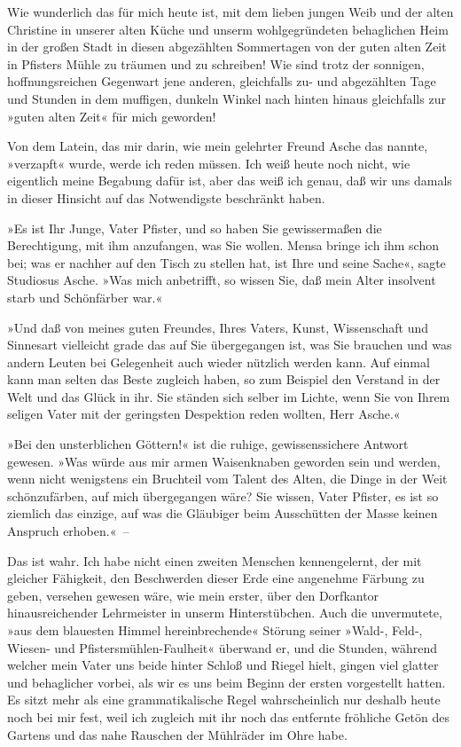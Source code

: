 Wie wunderlich das für mich heute ist, mit dem lieben jungen Weib
und der alten Christine in unserer alten Küche und unserm
wohlgegründeten behaglichen Heim in der großen Stadt in diesen
abgezählten Sommertagen von der guten alten Zeit in Pfisters Mühle
zu träumen und zu schreiben! Wie sind trotz der sonnigen,
hoffnungsreichen Gegenwart jene anderen, gleichfalls zu- und
abgezählten Tage und Stunden in dem muffigen, dunkeln Winkel nach
hinten hinaus gleichfalls zur »guten alten Zeit« für mich
geworden!

Von dem Latein, das mir darin, wie mein gelehrter Freund Asche das
nannte, »verzapft« wurde, werde ich reden müssen. Ich weiß heute
noch nicht, wie eigentlich meine Begabung dafür ist, aber das weiß
ich genau, daß wir uns damals in dieser Hinsicht auf das
Notwendigste beschränkt haben.

»Es ist Ihr Junge, Vater Pfister, und so haben Sie gewissermaßen
die Berechtigung, mit ihm anzufangen, was Sie wollen. Mensa bringe
ich ihm schon bei; was er nachher auf den Tisch zu stellen hat, ist
Ihre und seine Sache«, sagte Studiosus Asche. »Was mich anbetrifft,
so wissen Sie, daß mein Alter insolvent starb und Schönfärber
war.«

»Und daß von meines guten Freundes, Ihres Vaters, Kunst,
Wissenschaft und Sinnesart vielleicht grade das auf Sie
übergegangen ist, was Sie brauchen und was andern Leuten bei
Gelegenheit auch wieder nützlich werden kann. Auf einmal kann man
selten das Beste zugleich haben, so zum Beispiel den Verstand in
der Welt und das Glück in ihr. Sie ständen sich selber im Lichte,
wenn Sie von Ihrem seligen Vater mit der geringsten Despektion
reden wollten, Herr Asche.«

»Bei den unsterblichen Göttern!« ist die ruhige, gewissenssichere
Antwort gewesen. »Was würde aus mir armen Waisenknaben geworden
sein und werden, wenn nicht wenigstens ein Bruchteil vom Talent des
Alten, die Dinge in der Weit schönzufärben, auf mich übergegangen
wäre? Sie wissen, Vater Pfister, es ist so ziemlich das einzige,
auf was die Gläubiger beim Ausschütten der Masse keinen Anspruch
erhoben.«~–

Das ist wahr. Ich habe nicht einen zweiten Menschen kennengelernt,
der mit gleicher Fähigkeit, den Beschwerden dieser Erde eine
angenehme Färbung zu geben, versehen gewesen wäre, wie mein erster,
über den Dorfkantor hinausreichender Lehrmeister in unserm
Hinterstübchen. Auch die unvermutete, »aus dem blauesten Himmel
hereinbrechende« Störung seiner »Wald-, Feld-, Wiesen- und
Pfistersmühlen-Faulheit« überwand er, und die Stunden, während
welcher mein Vater uns beide hinter Schloß und Riegel hielt, gingen
viel glatter und behaglicher vorbei, als wir es uns beim Beginn der
ersten vorgestellt hatten. Es sitzt mehr als eine grammatikalische
Regel wahrscheinlich nur deshalb heute noch bei mir fest, weil ich
zugleich mit ihr noch das entfernte fröhliche Getön des Gartens und
das nahe Rauschen der Mühlräder im Ohre habe.


